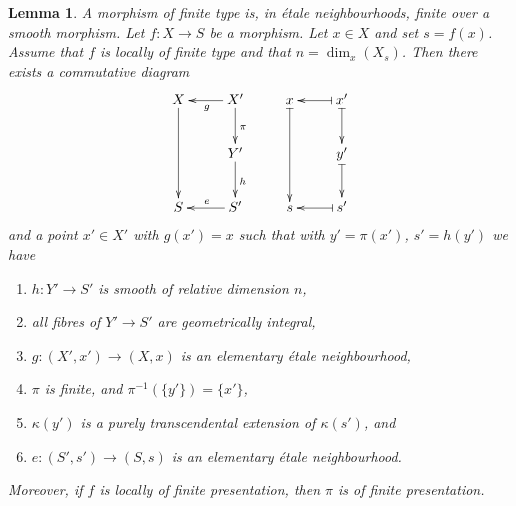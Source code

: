 \documentclass{amsart}
\newenvironment{slogan}{\comment}{\endcomment}
\theoremstyle{plain}
\newtheorem{lemma}[subsection]{Lemma}
\theoremstyle{definition}
\theoremstyle{remark}
\numberwithin{equation}{subsection}
\begin{document}
\begin{lemma}
\label{more-morphisms-lemma-local-local-structure-finite-type}
\begin{slogan}
A morphism of finite type is, in \'etale neighbourhoods, finite over a
smooth morphism.
\end{slogan}
Let $f : X \to S$ be a morphism. Let $x \in X$ and set $s = f(x)$.
Assume that $f$ is locally of finite type and that $n = \dim_x(X_s)$.
Then there exists a commutative diagram
$$
\xymatrix{
X \ar[dd] & X' \ar[l]^g \ar[d]^\pi & x \ar@{|->}[dd] &
x' \ar@{|->}[l] \ar@{|->}[d] \\
& Y' \ar[d]^h & & y' \ar@{|->}[d] \\
S & S' \ar[l]_e & s & s' \ar@{|->}[l]
}
$$
and a point $x' \in X'$ with $g(x') = x$ such that with $y' = \pi(x')$,
$s' = h(y')$ we have
\begin{enumerate}
\item $h : Y' \to S'$ is smooth of relative dimension $n$,
\item all fibres of $Y' \to S'$ are geometrically integral,
\item $g : (X', x') \to (X, x)$ is an elementary \'etale neighbourhood,
\item $\pi$ is finite, and $\pi^{-1}(\{y'\}) = \{x'\}$,
\item $\kappa(y')$ is a purely transcendental extension of $\kappa(s')$, and
\item $e : (S', s') \to (S, s)$ is an elementary \'etale neighbourhood.
\end{enumerate}
Moreover, if $f$ is locally of finite presentation, then $\pi$ is
of finite presentation.
\end{lemma}
\end{document}
